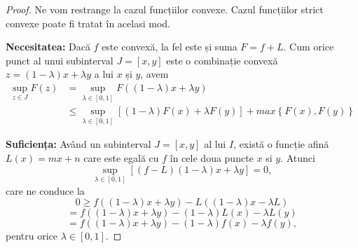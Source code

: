 \documentclass[a4paper,12pt,oneside]{report}
\begin{document}
\begin{proof}
Ne vom restrange la cazul funcțiilor convexe. Cazul funcțiilor strict convexe poate fi tratat în acelasi mod.

\textbf{Necesitatea:} Dacă \(f\) este convexă, la fel este și suma \(F = f + L\). Cum orice punct al unui subinterval \(J = \left [ x , y \right ]\) este o combinație convexă \(z = \left ( 1 - \lambda  \right )x + \lambda y \) a lui \(x\) și \(y\), avem
\begin{equation*}
\begin{split}
  \sup_{z\in J}F\left ( z \right ) &= \sup_{\lambda \in \left [ 0 , 1 \right ]}F\left ( \left ( 1 - \lambda  \right )x + \lambda y \right )\\
  &\leq \sup_{\lambda \in \left [ 0,1 \right ]}\left [ \left ( 1-\lambda  \right )F\left ( x \right ) + \lambda F\left ( y \right ) \right ] + max \left \{ F\left ( x \right ), F\left ( y \right ) \right \}
  \end{split}
\end{equation*}

\textbf{Suficiența:} Având un subinterval \(J = \left [ x,y \right ]\) al lui \(I\), există o funcție afină \(L\left ( x \right ) = mx + n\) care este egală cu \(f\) în cele doua puncte  \(x\) si \(y\).
Atunci
\begin{displaymath}
  \sup_{\lambda \in \left [ 0,1 \right ]}\left [ \left ( f - L \right )\left ( 1 - \lambda  \right )x + \lambda y \right ] = 0,
\end{displaymath}
care ne conduce la
\begin{displaymath}
  0\geq f\left ( \left ( 1 - \lambda  \right )x + \lambda y \right )- L\left ( \left ( 1 - \lambda  \right )x - \lambda L \right )
\end{displaymath}
  \begin{displaymath}
  = f\left ( \left ( 1 - \lambda  \right )x + \lambda y  \right ) - \left ( 1 - \lambda  \right )L\left ( x \right ) - \lambda L\left ( y \right )
\end{displaymath}
\begin{displaymath}
  = f\left ( \left ( 1 - \lambda  \right )x + \lambda y \right ) - \left ( 1 - \lambda  \right ) f\left ( x \right ) - \lambda f \left ( y \right ),
\end{displaymath}
pentru orice \(\lambda \in \left [ 0,1 \right ]\).
\end{proof}
\end{document}
